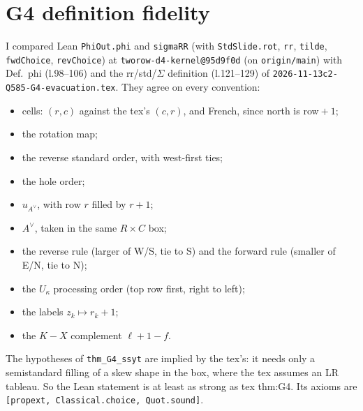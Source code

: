 \documentclass[11pt]{article}
\begin{document}
\section{G4 definition fidelity}
I compared Lean \texttt{PhiOut.phi} and \texttt{sigmaRR} (with \texttt{StdSlide.rot}, \texttt{rr}, \texttt{tilde}, \texttt{fwdChoice}, \texttt{revChoice}) at \texttt{tworow-d4-kernel@95d9f0d} (on \texttt{origin/main}) with Def.~phi (l.98--106) and the rr/std/$\Sigma$ definition (l.121--129) of \texttt{2026-11-13c2-Q585-G4-evacuation.tex}. They agree on every convention:
\begin{itemize}[nosep]
\item cells: $(r,c)$ against the tex's $(c,r)$, and French, since north is row${}+1$;
\item the rotation map;
\item the reverse standard order, with west-first ties;
\item the hole order;
\item $u_{A^\vee}$, with row $r$ filled by $r{+}1$;
\item $A^\vee$, taken in the same $R\times C$ box;
\item the reverse rule (larger of W/S, tie to S) and the forward rule (smaller of E/N, tie to N);
\item the $U_\kappa$ processing order (top row first, right to left);
\item the labels $z_k\mapsto r_k+1$;
\item the $K-X$ complement $\ell+1-f$.
\end{itemize}
The hypotheses of \texttt{thm\_G4\_ssyt} are implied by the tex's: it needs only a semistandard filling of a skew shape in the box, where the tex assumes an LR tableau. So the Lean statement is at least as strong as tex thm:G4. Its axioms are \texttt{[propext, Classical.choice, Quot.sound]}.
\end{document}
